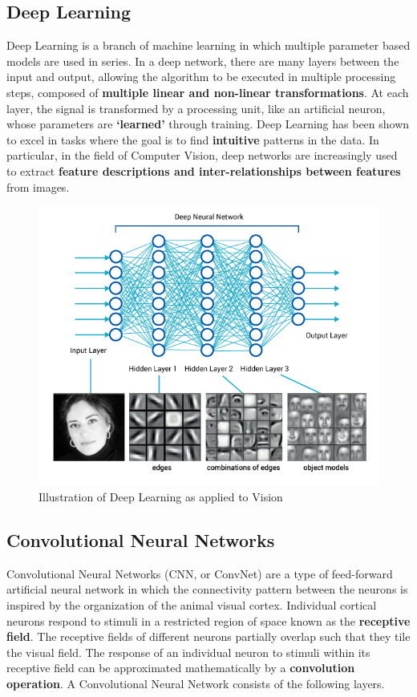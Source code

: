 \documentclass[12pt]{article}
\begin{document}
			\subsection{Deep Learning}
				Deep Learning is a branch of machine learning in which multiple parameter based models are used in series. In a deep network, there are many layers between the input and output, allowing the algorithm to be executed in multiple processing steps, composed of \textbf{multiple linear and non-linear transformations}. At each layer, the signal is transformed by a processing unit, like an artificial neuron, whose parameters are \textbf{`learned'} through training. Deep Learning has been shown to excel in tasks where the goal is to find \textbf{intuitive} patterns in the data.\cite{deep} In particular, in the field of Computer Vision, deep networks are increasingly used to extract \textbf{feature descriptions and inter-relationships between features} from images.\cite{cs231n}
				\begin{figure}[ht!]
					\includegraphics[width=14cm]{blog_deeplearning3.jpg}
					\caption{Illustration of Deep Learning as applied to Vision\label{fig2}}
				\end{figure}	

			\subsection{Convolutional Neural Networks}
			Convolutional Neural Networks (CNN, or ConvNet) are a type of feed-forward artificial neural network in which the connectivity pattern between the neurons is inspired by the organization of the animal visual cortex. Individual cortical neurons respond to stimuli in a restricted region of space known as the \textbf{receptive field}. The receptive fields of different neurons partially overlap such that they tile the visual field. The response of an individual neuron to stimuli within its receptive field can be approximated mathematically by a \textbf{convolution operation}. A Convolutional Neural Network consists of the following layers.\cite{showandtell}
								
\end{document}
